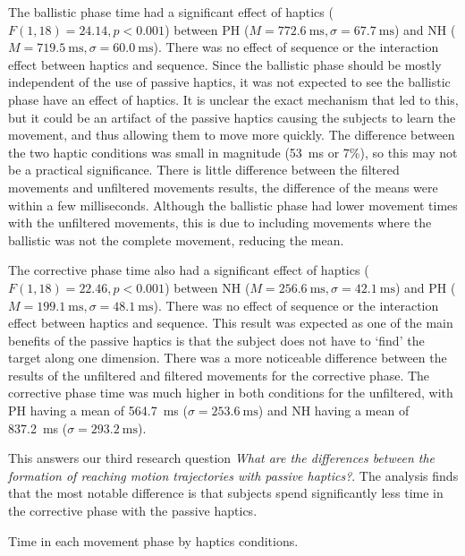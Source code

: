 The ballistic phase time had a significant effect of haptics ($F(1, 18)=24.14, p<0.001$) between PH ($M=\SI{772.6}{\milli\second}, \sigma=\SI{67.7}{\milli\second}$) and NH ($M=\SI{719.5}{\milli\second}, \sigma=\SI{60.0}{\milli\second}$).
There was no effect of sequence or the interaction effect between haptics and sequence.
Since the ballistic phase should be mostly independent of the use of passive haptics, it was not expected to see the ballistic phase have an effect of haptics.
It is unclear the exact mechanism that led to this, but it could be an artifact of the passive haptics causing the subjects to learn the movement, and thus allowing them to move more quickly.
The difference between the two haptic conditions was small in magnitude (\SI{53}{\milli\second} or 7\%), so this may not be a practical significance.
There is little difference between the filtered movements and unfiltered movements results, the difference of the means were within a few milliseconds.
Although the ballistic phase had lower movement times with the unfiltered movements, this is due to including movements where the ballistic was not the complete movement, reducing the mean.

The corrective phase time also had a significant effect of haptics ($F(1, 18)=22.46, p<0.001$) between NH ($M=\SI{256.6}{\milli\second}, \sigma=\SI{42.1}{\milli\second}$) and PH ($M=\SI{199.1}{\milli\second}, \sigma=\SI{48.1}{\milli\second}$).
There was no effect of sequence or the interaction effect between haptics and sequence.
This result was expected as one of the main benefits of the passive haptics is that the subject does not have to `find' the target along one dimension.
There was a more noticeable difference between the results of the unfiltered and filtered movements for the corrective phase.
The corrective phase time was much higher in both conditions for the unfiltered, with PH having a mean of \SI{564.7}{\milli\second} ($\sigma=\SI{253.6}{\milli\second}$) and NH having a mean of \SI{837.2}{\milli\second} ($\sigma=\SI{293.2}{\milli\second}$).

This answers our third research question \emph{What are the differences between the formation of reaching motion trajectories with passive haptics?}.
The analysis finds that the most notable difference is that subjects spend significantly less time in the corrective phase with the passive haptics.

\begin{table}
    \centering
    \caption{Time in each movement phase by haptics conditions.}
    \label{tab:ph_phases}
\end{table}

